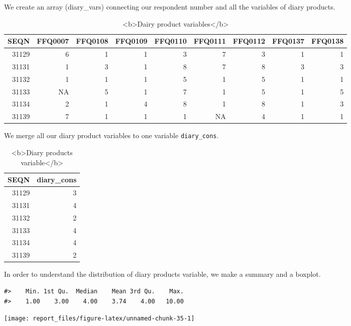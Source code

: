 \documentclass[
]{article}
\begin{document}
We create an array (diary\_vars) connecting our respondent number and
all the variables of diary products.

\begin{table}

\caption{\label{tab:unnamed-chunk-33}<b>Dairy product variables</b>}
\centering
\begin{tabular}[t]{r|r|r|r|r|r|r|r|r}
\hline
SEQN & FFQ0007 & FFQ0108 & FFQ0109 & FFQ0110 & FFQ0111 & FFQ0112 & FFQ0137 & FFQ0138\\
\hline
31129 & 6 & 1 & 1 & 3 & 7 & 3 & 1 & 1\\
\hline
31131 & 1 & 3 & 1 & 8 & 7 & 8 & 3 & 3\\
\hline
31132 & 1 & 1 & 1 & 5 & 1 & 5 & 1 & 1\\
\hline
31133 & NA & 5 & 1 & 7 & 1 & 5 & 1 & 5\\
\hline
31134 & 2 & 1 & 4 & 8 & 1 & 8 & 1 & 3\\
\hline
31139 & 7 & 1 & 1 & 1 & NA & 4 & 1 & 1\\
\hline
\end{tabular}
\end{table}

We merge all our diary product variables to one variable
\texttt{diary\_cons}.

\begin{table}

\caption{\label{tab:unnamed-chunk-34}<b>Diary products variable</b>}
\centering
\begin{tabular}[t]{r|r}
\hline
SEQN & diary\_cons\\
\hline
31129 & 3\\
\hline
31131 & 4\\
\hline
31132 & 2\\
\hline
31133 & 4\\
\hline
31134 & 4\\
\hline
31139 & 2\\
\hline
\end{tabular}
\end{table}

In order to understand the distribution of diary products variable, we
make a summary and a boxplot.

\begin{verbatim}
#>    Min. 1st Qu.  Median    Mean 3rd Qu.    Max. 
#>    1.00    3.00    4.00    3.74    4.00   10.00
\end{verbatim}

\begin{center}\texttt{[image: report\_files/figure-latex/unnamed-chunk-35-1]} \end{center}
\end{document}
